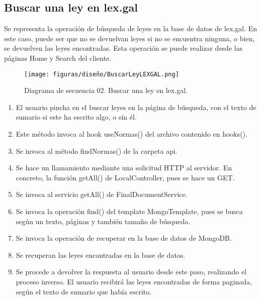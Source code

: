 \subsection{Buscar una ley en lex.gal}

Se representa la operación de búsqueda de leyes en la base de datos de lex.gal. En este caso, puede ser que no se devuelvan leyes si no se encuentra ninguna, o bien, se devuelven las leyes encontradas. Esta operación se puede realizar desde las páginas Home y Search del cliente.

\begin{figure}[H]
\centerline{\texttt{[image: figuras/diseño/BuscarLeyLEXGAL.png]}}
\caption{Diagrama de secuencia 02. Buscar una ley en lex.gal.}
\label{enlaceDBuscar}
\end{figure}

\begin{enumerate}
    \item El usuario pincha en el buscar leyes en la página de búsqueda, con el texto de sumario si este ha escrito algo, o sin él.
    \item Este método invoca al hook useNormas() del archivo contenido en hooks().
    \item Se invoca al método findNormas() de la carpeta api.
    \item Se hace un llamamiento mediante una solicitud HTTP al servidor. En concreto, la función getAll() de LocalController, pues se hace un GET.
    \item Se invoca al servicio getAll() de FinalDocumentService.
    \item Se invoca la operación find() del template MongoTemplate, pues se busca según un texto, páginas y también tamaño de búsqueda.
    \item Se invoca la operación de recuperar en la base de datos de MongoDB.
    \item Se recuperan las leyes encontradas en la base de datos.
    \item Se procede a devolver la respuesta al usuario desde este paso, realizando el proceso inverso. El usuario recibirá las leyes encontradas de forma paginada, según el texto de sumario que había escrito.
\end{enumerate}